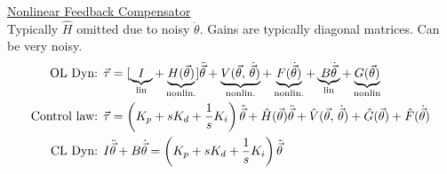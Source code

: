 \documentclass[twocolumn]{article}    %
\begin{document}

\noindent\underline{Nonlinear Feedback Compensator}\\
Typically \(\hat{H}\) omitted due to noisy \(\ddot{\theta}\). Gains are typically diagonal matrices. Can be very noisy. 
\begin{align*}
    \text{OL Dyn: }&
    \vec{\tau} = [\underbrace{I}_{\text{lin}} + \underbrace{H(\vec{\theta}) }_{\text{nonlin.}}]\ddot{\vec{\theta}} + \underbrace{V (\vec{\theta},\, \dot{\vec{\theta}})}_{\text{nonlin.}} + \underbrace{F(\dot{\vec{\theta}}) }_{\text{nonlin.}} + \underbrace{B\dot{\vec{\theta}} }_{\text{lin}} + \underbrace{G(\vec{\theta}) }_{\text{nonlin}}\\
    \text{Control law: }& \vec{\tau} = \left(K_p + sK_d + \frac{1}{s}K_i\right) \Tilde{\vec{\theta}} + \hat{H}(\vec{\theta}) \ddot{\vec{\theta}}  + \hat{V}(\vec{\theta},\, \dot{\vec{\theta}}) + \hat{G}(\vec{\theta}) + \hat{F}(\dot{\vec{\theta}})\\
    \text{CL Dyn: }& I\ddot{\vec{\theta}} + B\dot{\vec{\theta}} = \left(K_p + sK_d + \frac{1}{s}K_i\right) \Tilde{\vec{\theta}}
\end{align*}
\end{document}
